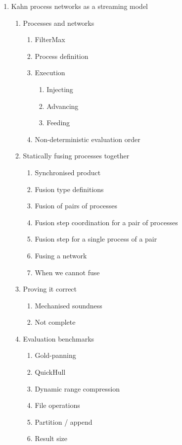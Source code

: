 \begin{enumerate}
\item Kahn process networks as a streaming model
  \begin{enumerate}
  \item Processes and networks 
    \begin{enumerate}
    \item FilterMax 
    \item Process definition 
    \item Execution 
      \begin{enumerate}
      \item Injecting 
      \item Advancing 
      \item Feeding 
      \end{enumerate}
    \item Non-deterministic evaluation order 
    \end{enumerate}

  \item Statically fusing processes together
    \begin{enumerate}
    \item Synchronised product 
    \item Fusion type definitions 
    \item Fusion of pairs of processes 
    \item Fusion step coordination for a pair of processes 
    \item Fusion step for a single process of a pair 
    \item Fusing a network 
    \item When we cannot fuse 
    \end{enumerate}

  \item Proving it correct 
    \begin{enumerate}
    \item Mechanised soundness 
    \item Not complete 
    \end{enumerate}

  \item Evaluation benchmarks 
    \begin{enumerate}
    \item Gold-panning 
    \item QuickHull \done
    \item Dynamic range compression \done
    \item File operations \done
    \item Partition / append \done
    \item Result size 
    \end{enumerate}


\end{enumerate}
\end{enumerate}

